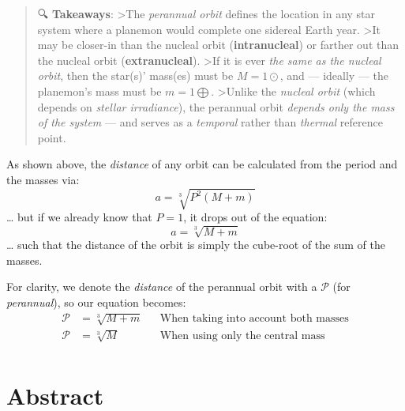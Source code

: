 \documentclass[
  letterpaper,
]{book}
\begin{document}
\begin{quote}
🔍 \textbf{Takeaways}: \textgreater The \emph{perannual orbit} defines
the location in any star system where a planemon would complete one
sidereal Earth year. \textgreater It may be closer-in than the nucleal
orbit (\textbf{intranucleal}) or farther out than the nucleal orbit
(\textbf{extranucleal}). \textgreater If it is ever \emph{the same as
the nucleal orbit}, then the star(s)' mass(es) must be \(M = 1⊙\), and
--- ideally --- the planemon's mass must be \(m = 1⨁\).
\textgreater Unlike the \emph{nucleal orbit} (which depends on
\emph{stellar irradiance}), the perannual orbit \emph{depends only the
mass of the system} --- and serves as a \emph{temporal} rather than
\emph{thermal} reference point.
\end{quote}

As shown above, the \emph{distance} of any orbit can be calculated from
the period and the masses via: \[
a = \sqrt[3]{P^2 (M+m)}
\] \ldots{} but if we already know that \(P = 1\), it drops out of the
equation: \[
a = \sqrt[3]{M+m}
\] \ldots{} such that the distance of the orbit is simply the cube-root
of the sum of the masses.

For clarity, we denote the \emph{distance} of the perannual orbit with a
\(\mathcal{P}\) (for \emph{perannual}), so our equation becomes: \[
\begin{align}
\mathcal{P} &= \sqrt[3]{M+m} &&\text{When taking into account both masses} \\
\mathcal{P} &= \sqrt[3]{M} &&\text{When using only the central mass} \\
\end{align}
\]

\section{Abstract}\label{abstract-11}
\end{document}
